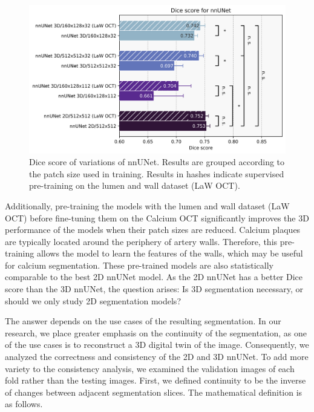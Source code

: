 \documentclass[a4paper,11pt,oneside]{report}
\begin{document}
\begin{figure}[h]
    \centering
    \includegraphics[width=0.8\linewidth]{figures/result_nnunet_results.png}
    \caption{Dice score of variations of nnUNet. Results are grouped according to the patch size used in training. Results in hashes indicate supervised pre-training on the lumen and wall dataset (LaW OCT). 
    }
    \label{fig:nnunet-results}
\end{figure}

Additionally, pre-training the models with the lumen and wall dataset (LaW OCT) before fine-tuning them on the Calcium OCT significantly improves the 3D performance of the models when their patch sizes are reduced. Calcium plaques are typically located around the periphery of artery walls. Therefore, this pre-training allows the model to learn the features of the walls, which may be useful for calcium segmentation. These pre-trained models are also statistically comparable to the best 2D nnUNet model. As the 2D nnUNet has a better Dice score than the 3D nnUNet, the question arises: Is 3D segmentation necessary, or should we only study 2D segmentation models?

The answer depends on the use cases of the resulting segmentation. In our research, we place greater emphasis on the continuity of the segmentation, as one of the use cases is to reconstruct a 3D digital twin of the image. Consequently, we analyzed the correctness and consistency of the 2D and 3D nnUNet. To add more variety to the consistency analysis, we examined the validation images of each fold rather than the testing images. First, we defined continuity to be the inverse of changes between adjacent segmentation slices. The mathematical definition is as follows.
\end{document}
